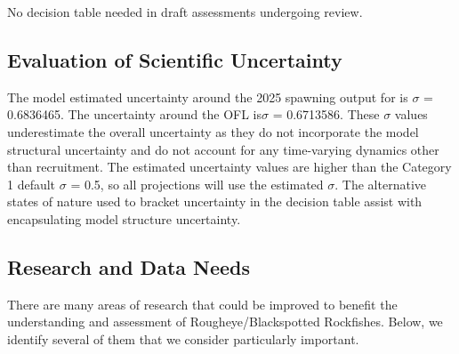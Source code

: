 \documentclass[
]{scrartcl}
\begin{document}
No decision table needed in draft assessments undergoing review.

\subsection{Evaluation of Scientific Uncertainty}\label{sec-uncertainty}

The model estimated uncertainty around the 2025 spawning output for is
\(\sigma\) = 0.6836465. The uncertainty around the OFL is\(\sigma\) =
0.6713586. These \(\sigma\) values underestimate the overall uncertainty
as they do not incorporate the model structural uncertainty and do not
account for any time-varying dynamics other than recruitment. The
estimated uncertainty values are higher than the Category 1 default
\(\sigma\) = 0.5, so all projections will use the estimated \(\sigma\).
The alternative states of nature used to bracket uncertainty in the
decision table assist with encapsulating model structure uncertainty.

\subsection{Research and Data Needs}\label{research-and-data-needs-1}

There are many areas of research that could be improved to benefit the
understanding and assessment of Rougheye/Blackspotted Rockfishes. Below,
we identify several of them that we consider particularly important.
\end{document}
